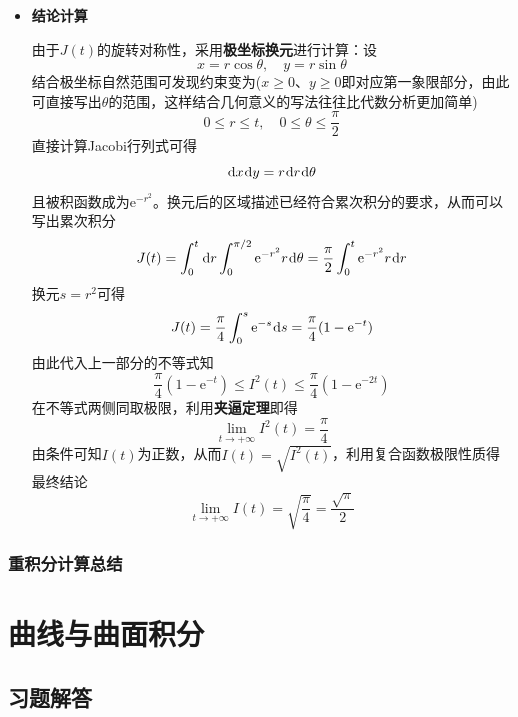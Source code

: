 \documentclass[a4paper,UTF8,fontset=windows,AutoFakeBold]{ctexart}
\newcommand*{\dr}{\hspace{0.07em}\mathrm{d}}
\newcommand*{\er}{\mathrm{e}}
\theoremstyle{ex}
\begin{document}
\begin{framed}
{\begin{itemize}
        \item \textbf{结论计算}

        由于$J(t)$的旋转对称性，采用\textbf{极坐标换元}进行计算：设
        $$x=r\cos\theta,\quad y=r\sin\theta$$
        结合极坐标自然范围可发现约束变为($x\ge0$、$y\ge0$即对应第一象限部分，由此可直接写出$\theta$的范围，这样结合几何意义的写法往往比代数分析更加简单)
        $$0\le r\le t,\quad0\le\theta\le\frac{\pi}{2}$$
        直接计算Jacobi行列式可得
        $$\dr x\dr y=r\dr r\dr\theta$$
        且被积函数成为$\er^{-r^2}$。换元后的区域描述已经符合累次积分的要求，从而可以写出累次积分
        $$J(t)=\int_0^t\dr r\int_0^{\pi/2}\er^{-r^2}r\dr\theta=\frac{\pi}{2}\int_0^t\er^{-r^2}r\dr r$$
        换元$s=r^2$可得
        $$J(t)=\frac{\pi}{4}\int_0^s\er^{-s}\dr s=\frac{\pi}{4}(1-\er^{-t})$$
        由此代入上一部分的不等式知
        $$\frac{\pi}{4}(1-\er^{-t})\le I^2(t)\le\frac{\pi}{4}(1-\er^{-2t})$$
        在不等式两侧同取极限，利用\textbf{夹逼定理}即得
        $$\lim_{t\to+\infty}I^2(t)=\frac{\pi}{4}$$
        由条件可知$I(t)$为正数，从而$I(t)=\sqrt{I^2(t)}$，利用复合函数极限性质得最终结论
        $$\lim_{t\to+\infty}I(t)=\sqrt{\frac{\pi}{4}}=\frac{\sqrt\pi}{2}$$
    \end{itemize}
}
\end{framed}

\subsubsection{重积分计算总结}

\newpage
\section{曲线与曲面积分}
\subsection{习题解答}
\end{document}
